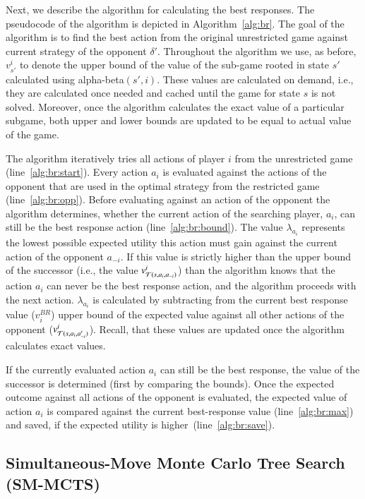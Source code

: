 Next, we describe the algorithm for calculating the best responses. 
The pseudocode of the algorithm is depicted in Algorithm~\ref{alg:br}.
The goal of the algorithm is to find the best action from the original unrestricted game against current strategy of the opponent $\delta'$. 
Throughout the algorithm we use, as before, $v^i_{s'}$ to denote the upper bound of the value of the sub-game rooted in state $s'$ calculated using alpha-beta$(s',i)$. These values are calculated on demand, i.e., they are calculated once needed and cached until the game for state $s$ is not solved.
Moreover, once the algorithm calculates the exact value of a particular subgame, both upper and lower bounds are updated to be equal to actual value of the game. 

The algorithm iteratively tries all actions of player $i$ from the unrestricted game (line~\ref{alg:br:start}). 
Every action $a_i$ is evaluated against the actions of the opponent that are used in the optimal strategy from the restricted game (line~\ref{alg:br:opp}).
Before evaluating against an action of the opponent the algorithm determines, whether the current action of the searching player, $a_i$, can still be the best response action (line~\ref{alg:br:bound}). 
The value $\lambda_{a_i}$ represents the lowest possible expected utility this action must gain against the current action of the opponent $a_{-i}$. 
If this value is strictly higher than the upper bound of the successor (i.e., the value $v^i_{\mathcal{T}(s,a_i,a_{-i})}$) than the algorithm knows that the action $a_i$ can never be the best response action, and the algorithm proceeds with the next action.
$\lambda_{a_i}$ is calculated by subtracting from the current best response value ($v_i^{BR}$) upper bound of the expected value against all other actions of the opponent ($v^i_{\mathcal{T}(s,a_i,a'_{-i})}$). Recall, that these values are updated once the algorithm calculates exact values.

If the currently evaluated action $a_i$ can still be the best response, the value of the successor is determined (first by comparing the bounds). Once the expected outcome against all actions of the opponent is evaluated, the expected value of action $a_i$ is compared against the current best-response value (line~\ref{alg:br:max}) and saved, if the expected utility is higher~(line~\ref{alg:br:save}).


\subsection{Simultaneous-Move Monte Carlo Tree Search (SM-MCTS)}\label{sec:smmcts}

